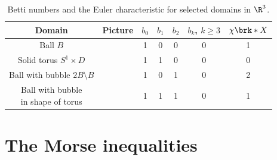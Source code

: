 \begin{table}
  \centering
  \renewcommand{\arraystretch}{3}
  \begin{tabular}{c|c|c|c|c|c|c}
    Domain & Picture & $b_0$ & $b_1$ & $b_2$ & $b_k$, $k\geq3$ & $\chi\brk*{X}$ \\ \hline
    Ball $B$ & 
    \begin{minipage}{0.1\textwidth}
      \def\svgwidth{\textwidth}
      
    \end{minipage}
    & 1 & 0 & 0 & 0 & 1 \\
    Solid torus $S^1\times D$ & 
    \begin{minipage}{0.1\textwidth}
      \def\svgwidth{\textwidth}
      
    \end{minipage}
    & 1 & 1 & 0 & 0 & 0 \\
    Ball with bubble $2B\setminus B$ & 
    \begin{minipage}{0.1\textwidth}
      \def\svgwidth{\textwidth}
      
    \end{minipage}
    & 1 & 0 & 1 & 0 & 2 \\
    \makecell{Ball with bubble \\in shape of torus} & 
    \begin{minipage}{0.1\textwidth}
      \def\svgwidth{\textwidth}
      
    \end{minipage}
    & 1 & 1 & 1 & 0  & 1\\
  \end{tabular}
  \caption{Betti numbers and the Euler characteristic for selected domains in $\R^3$.}
  \label{tb:n3_domains_bettiNbrs}
\end{table}

\section{The Morse inequalities}

